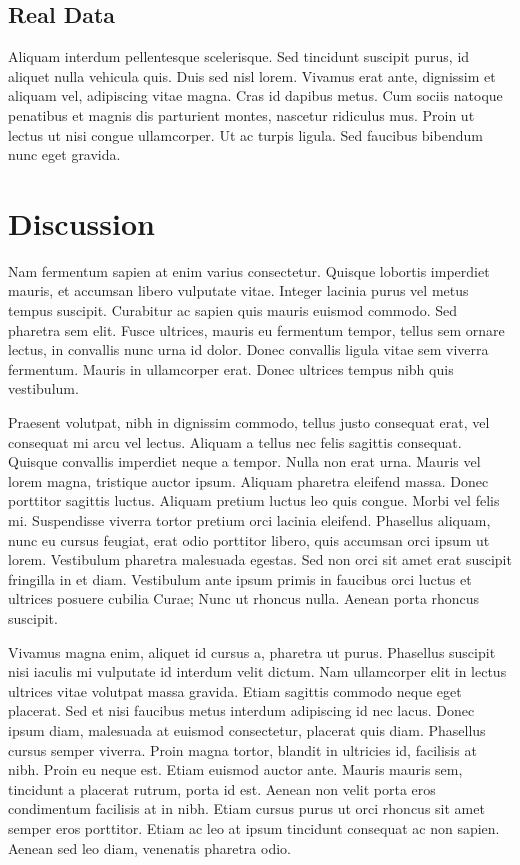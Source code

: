 \documentclass[draft, grl]{agutex}
\begin{document}
\begin{article}
\subsection{Real Data}

Aliquam interdum pellentesque scelerisque. Sed tincidunt suscipit purus, id aliquet nulla vehicula quis. Duis sed nisl lorem. Vivamus erat ante, dignissim et aliquam vel, adipiscing vitae magna. Cras id dapibus metus. Cum sociis natoque penatibus et magnis dis parturient montes, nascetur ridiculus mus. Proin ut lectus ut nisi congue ullamcorper. Ut ac turpis ligula. Sed faucibus bibendum nunc eget gravida.


\section{Discussion}

Nam fermentum sapien at enim varius consectetur. Quisque lobortis imperdiet mauris, et accumsan libero vulputate vitae. Integer lacinia purus vel metus tempus suscipit. Curabitur ac sapien quis mauris euismod commodo. Sed pharetra sem elit. Fusce ultrices, mauris eu fermentum tempor, tellus sem ornare lectus, in convallis nunc urna id dolor. Donec convallis ligula vitae sem viverra fermentum. Mauris in ullamcorper erat. Donec ultrices tempus nibh quis vestibulum.

Praesent volutpat, nibh in dignissim commodo, tellus justo consequat erat, vel consequat mi arcu vel lectus. Aliquam a tellus nec felis sagittis consequat. Quisque convallis imperdiet neque a tempor. Nulla non erat urna. Mauris vel lorem magna, tristique auctor ipsum. Aliquam pharetra eleifend massa. Donec porttitor sagittis luctus. Aliquam pretium luctus leo quis congue. Morbi vel felis mi. Suspendisse viverra tortor pretium orci lacinia eleifend. Phasellus aliquam, nunc eu cursus feugiat, erat odio porttitor libero, quis accumsan orci ipsum ut lorem. Vestibulum pharetra malesuada egestas. Sed non orci sit amet erat suscipit fringilla in et diam. Vestibulum ante ipsum primis in faucibus orci luctus et ultrices posuere cubilia Curae; Nunc ut rhoncus nulla. Aenean porta rhoncus suscipit.

Vivamus magna enim, aliquet id cursus a, pharetra ut purus. Phasellus suscipit nisi iaculis mi vulputate id interdum velit dictum. Nam ullamcorper elit in lectus ultrices vitae volutpat massa gravida. Etiam sagittis commodo neque eget placerat. Sed et nisi faucibus metus interdum adipiscing id nec lacus. Donec ipsum diam, malesuada at euismod consectetur, placerat quis diam. Phasellus cursus semper viverra. Proin magna tortor, blandit in ultricies id, facilisis at nibh. Proin eu neque est. Etiam euismod auctor ante. Mauris mauris sem, tincidunt a placerat rutrum, porta id est. Aenean non velit porta eros condimentum facilisis at in nibh. Etiam cursus purus ut orci rhoncus sit amet semper eros porttitor. Etiam ac leo at ipsum tincidunt consequat ac non sapien. Aenean sed leo diam, venenatis pharetra odio.


\end{article}
\end{document}
